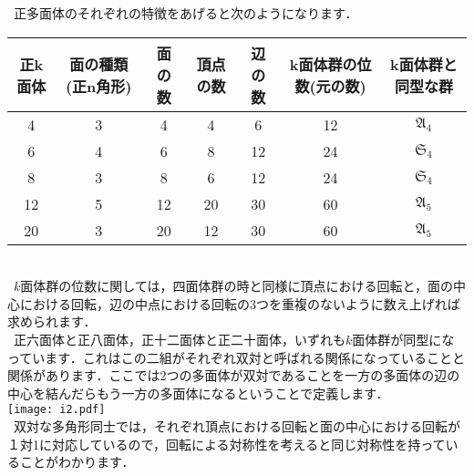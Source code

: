 \documentclass[./main]{subfiles}
\theoremstyle{idefinition}
\begin{document}
\ 正多面体のそれぞれの特徴をあげると次のようになります．\\


\begin{tabular}{|c||c|c|c|c|c|c|}\hline
正k面体 & 面の種類(正n角形) & 面の数 & 頂点の数 & 辺の数 & k面体群の位数(元の数) & k面体群と同型な群\\\hline
4 & 3 & 4 & 4 & 6 & 12 & $\mathfrak{A}_4$\\\hline 
6 & 4 & 6 & 8 & 12 & 24 & $\mathfrak{S}_4$\\\hline 
8 & 3 & 8 & 6 & 12 & 24 & $\mathfrak{S}_4$\\\hline 
12 & 5 & 12 & 20 & 30 & 60 & $\mathfrak{A}_5$\\\hline 
20 & 3 & 20 & 12 & 30 & 60 & $\mathfrak{A}_5$\\\hline 
\end{tabular}\\

\ $k$面体群の位数に関しては，四面体群の時と同様に頂点における回転と，面の中心における回転，辺の中点における回転の$3$つを重複のないように数え上げれば求められます．\\
\ 正六面体と正八面体，正十二面体と正二十面体，いずれも$k$面体群が同型になっています．これはこの二組がそれぞれ双対と呼ばれる関係になっていることと関係があります．ここでは2つの多面体が双対であることを一方の多面体の辺の中心を結んだらもう一方の多面体になるということで定義します．\\
\texttt{[image: i2.pdf]}\\
\ 双対な多角形同士では，それぞれ頂点における回転と面の中心における回転が１対1に対応しているので，回転による対称性を考えると同じ対称性を持っていることがわかります．\\
\end{document}
